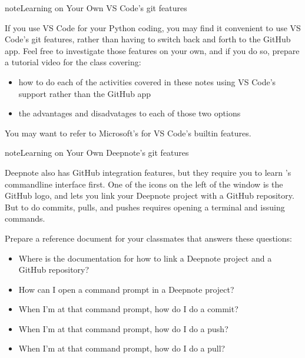 \documentclass[letterpaper,10pt,english]{jupyterBook}
\begin{document}
\begin{sphinxadmonition}{note}{Learning on Your Own \sphinxhyphen{} VS Code’s git features}

\sphinxAtStartPar
If you use VS Code for your Python coding, you may find it convenient to use VS Code’s git features, rather than having to switch back and forth to the GitHub app.  Feel free to investigate those features on your own, and if you do so, prepare a tutorial video for the class covering:
\begin{itemize}
\item {} 
\sphinxAtStartPar
how to do each of the activities covered in these notes using VS Code’s  support rather than the GitHub app

\item {} 
\sphinxAtStartPar
the advantages and disadvatages to each of those two options

\end{itemize}

\sphinxAtStartPar
You may want to refer to Microsoft’s  for VS Code’s built\sphinxhyphen{}in  features.
\end{sphinxadmonition}

\begin{sphinxadmonition}{note}{Learning on Your Own \sphinxhyphen{} Deepnote’s git features}

\sphinxAtStartPar
Deepnote also has GitHub integration features, but they require you to learn ’s command\sphinxhyphen{}line interface first.  One of the icons on the left of the window is the GitHub logo, and lets you link your Deepnote project with a GitHub repository.  But to do commits, pulls, and pushes requires opening a terminal and issuing  commands.

\sphinxAtStartPar
Prepare a reference document for your classmates that answers these questions:
\begin{itemize}
\item {} 
\sphinxAtStartPar
Where is the documentation for how to link a Deepnote project and a GitHub repository?

\item {} 
\sphinxAtStartPar
How can I open a command prompt in a Deepnote project?

\item {} 
\sphinxAtStartPar
When I’m at that command prompt, how do I do a  commit?

\item {} 
\sphinxAtStartPar
When I’m at that command prompt, how do I do a  push?

\item {} 
\sphinxAtStartPar
When I’m at that command prompt, how do I do a  pull?

\end{itemize}
\end{sphinxadmonition}
\end{document}
